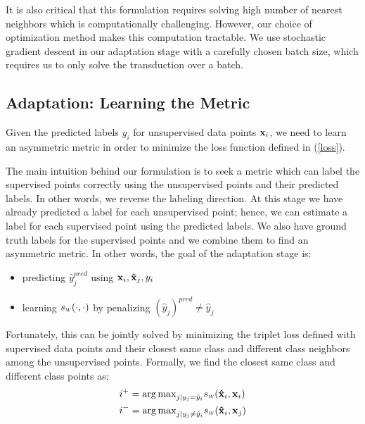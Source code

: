 It is also critical that this formulation requires solving high number of nearest neighbors which is computationally challenging. However, our choice of optimization method makes this computation tractable. We use stochastic gradient descent in our adaptation stage with a carefully chosen batch size, which requires us to only solve the transduction over a batch. %

\subsection{Adaptation: Learning the Metric}
\label{metric}
Given the predicted labels $y_i$ for unsupervised data points $\mathbf{x}_i$, we need to learn an asymmetric metric in order to minimize the loss function defined in (\ref{loss}). 

The main intuition behind our formulation is to seek a metric which can label the supervised points correctly using the unsupervised points and their predicted labels. In other words, we reverse the labeling direction. At this stage we have already predicted a label for each unsupervised point; hence, we can estimate a label for each supervised point using the predicted labels. We also have ground truth labels for the supervised points and we combine them to find an asymmetric metric. In other words, the goal of the adaptation stage is:

\vspace{-3mm}
\begin{itemize}
\item predicting $\hat{y}^{pred}_j$ using $\mathbf{x}_i, \mathbf{\hat{x}}_j, y_i$
\item learning $\sw(\cdot,\cdot)$ by penalizing  $(\hat{y}_j)^{pred} \neq \hat{y}_j$ 
\end{itemize}

Fortunately, this can be jointly solved by minimizing the triplet loss defined with supervised data points and their closest same class and different class neighbors among the unsupervised points. Formally, we find the closest same class and different class points as;
\begin{equation}
\begin{aligned}
&i^{+} = {\arg\max}_{j | y_j = \hat{y}_i} \sw(\xsi, \xui) \\
&i^{-} = {\arg\max}_{j | y_j \neq \hat{y}_i} \sw(\xsi,\xuj) 
\label{sup_nn}
\end{aligned}
\end{equation}

